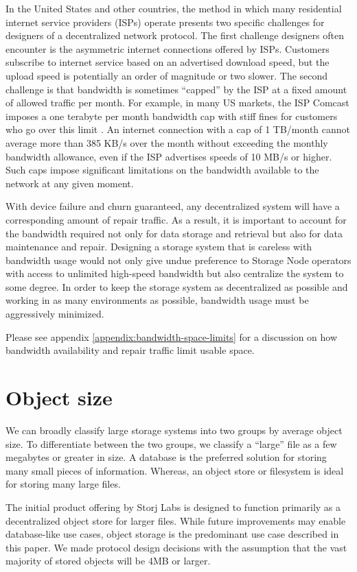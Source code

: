 \documentclass[8pt,fleqn,openany]{book}
\begin{document}
In the United States and other countries,
the method in which many residential internet service providers (ISPs)
operate presents two specific challenges for designers of a
decentralized network protocol. The first challenge designers often encounter is
the asymmetric internet connections offered by ISPs.
Customers subscribe to internet service
based on an advertised download speed, but the upload speed is potentially an
order of magnitude or two slower. The second challenge is that bandwidth is
sometimes ``capped'' by the ISP at a fixed amount of allowed traffic per month.
For example, in many
US markets, the ISP Comcast imposes a one terabyte per month bandwidth cap
with stiff fines for customers who go over this limit \cite{comcast-cap}.
An internet connection with a cap of 1 TB/month cannot average more than
385 KB/s over the month without exceeding the monthly bandwidth allowance,
even if the ISP advertises speeds of 10 MB/s or higher.
Such caps impose
significant limitations on the bandwidth available to the network
at any given moment.

With device failure and churn guaranteed, any decentralized system will have a
corresponding amount of repair traffic. As a result, it is important to account
for the bandwidth required not only for data storage and retrieval but also
for data maintenance and repair. Designing a
storage system that is careless with bandwidth usage would not only give undue
preference to Storage Node operators with access to unlimited high-speed
bandwidth but also centralize the system to some degree. In order to keep the storage
system as decentralized as possible and working in as many environments
as possible, bandwidth usage must be aggressively minimized.

Please see appendix \ref{appendix:bandwidth-space-limits} for a discussion on how
bandwidth availability and repair traffic limit usable space.

\section{Object size}

We can broadly classify large storage systems into two groups by average
object size. To differentiate between the two groups, we classify a ``large'' file as a
few megabytes or greater in size. A database is the preferred solution for storing many small pieces of information. Whereas, an object store or filesystem is ideal for storing many large files.

The initial product offering by Storj Labs is designed to function primarily as
a decentralized object store for larger files.
While future improvements may enable
database-like use cases, object storage is the predominant use case described in
this paper. We made protocol design decisions with the assumption that the
vast majority of stored objects will be 4MB or larger.
\end{document}
